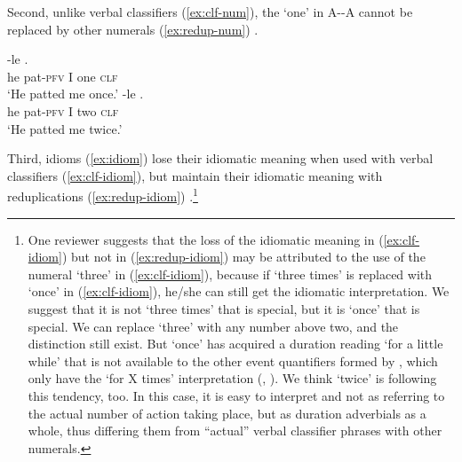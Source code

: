 \ea\label{ex:redup-sep}
\z
\z

Second, unlike verbal classifiers (\ref{ex:clf-num}), the  ‘one’ in A--A cannot be replaced by other numerals (\ref{ex:redup-num}) \citep[299--230]{YangWei2017}.

\ea\label{ex:clf-num}
  \ea \gll {} -le   .\\
   he pat-\textsc{pfv} I one \textsc{clf}\\
   \glt `He patted me once.'
   \ex \gll {} -le   .\\
    he pat-\textsc{pfv} I two \textsc{clf}\\
    \glt `He patted me twice.'
\z
\z

\ea\label{ex:redup-num}
\z
\z

Third, idioms (\ref{ex:idiom}) lose their idiomatic meaning when used with verbal classifiers (\ref{ex:clf-idiom}), but maintain their idiomatic meaning with reduplications (\ref{ex:redup-idiom}) \citep[230--231]{YangWei2017}.\footnote{
One reviewer suggests that the loss of the idiomatic meaning in (\ref{ex:clf-idiom}) but not in (\ref{ex:redup-idiom}) may be attributed to the use of the numeral  `three' in (\ref{ex:clf-idiom}),
because if   `three times' is replaced with   `once' in (\ref{ex:clf-idiom}), he/she can still get the idiomatic interpretation.
We suggest that it is not   `three times' that is special, 
but it is   `once' that is special.
We can replace  `three' with any number above two,
and the distinction still exist.
But   `once' has acquired a duration reading `for a little while' that is not available to the other event quantifiers formed by , which only have the `for X times' interpretation (\citealt[77]{Deng2013}, \citealt[16]{Zhang2000}).
We think   `twice' is following this tendency, too.
In this case, it is easy to interpret   and   not as referring to the actual number of action taking place,
but as duration adverbials as a whole,
thus differing them from ``actual'' verbal classifier phrases with other numerals.
}

